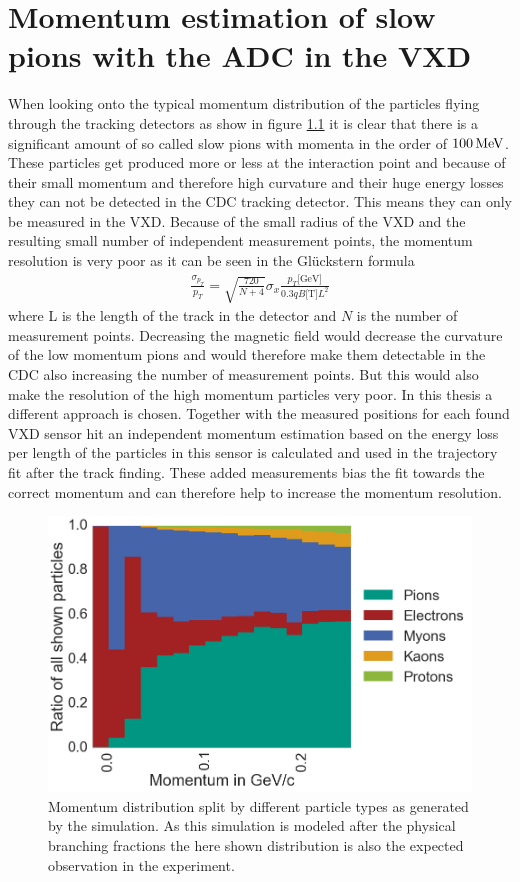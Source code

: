 \newcommand{\dedx}{$\mathrm d E / \mathrm d x$ }
\chapter{Momentum estimation of slow pions with the ADC in the VXD}


When looking onto the typical momentum distribution of the particles flying through the tracking detectors as show in figure \ref{fig-particles-momentum} it is clear that there is a significant amount of so called slow pions with momenta in the order of $\unit[100]{MeV}$. These particles get produced more or less at the interaction point and because of their small momentum and therefore high curvature and their huge energy losses they can not be detected in the CDC tracking detector. This means they can only be measured in the VXD. Because of the small radius of the VXD and the resulting small number of independent measurement points, the momentum resolution is very poor as it can be seen in the Glückstern formula
\begin{align*}
 \frac{\sigma_{p_T}}{p_T} = \sqrt{\frac{720}{N + 4}} \sigma_x \frac{p_T \text{[GeV]}}{0.3 q B \text{[T]} L^2}
\end{align*}
where L is the length of the track in the detector and $N$ is the number of measurement points. Decreasing the magnetic field would decrease the curvature of the low momentum pions and would therefore make them detectable in the CDC also increasing the number of measurement points. But this would also make the resolution of the high momentum particles very poor. In this thesis a different approach is chosen. Together with the measured positions for each found VXD sensor hit an independent momentum estimation based on the energy loss per length of the particles in this sensor is calculated and used in the trajectory fit after the track finding. These added measurements bias the fit towards the correct momentum and can therefore help to increase the momentum resolution.

\begin{figure}
 \centering
 \includegraphics[width=0.8\linewidth]{figures/vxd/momentumDistribution.png}
 \caption{Momentum distribution split by different particle types as generated by the simulation. As this simulation is modeled after the physical branching fractions the here shown distribution is also the expected observation in the experiment.}
 \label{fig-particles-momentum}
\end{figure}

